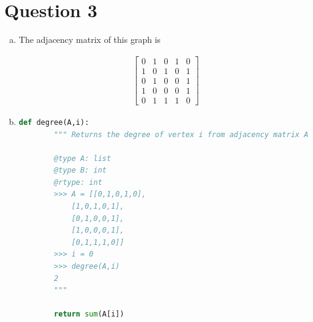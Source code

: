 \documentclass[12pt]{article}
\begin{document}
\section*{Question 3}
\begin{enumerate}[a.]
    \item

    The adjacency matrix of this graph is

    \setcounter{equation}{0}
    \begin{align}
    \begin{bmatrix}
    0 & 1 & 0 & 1 & 0\\
    1 & 0 & 1 & 0 & 1\\
    0 & 1 & 0 & 0 & 1\\
    1 & 0 & 0 & 0 & 1\\
    0 & 1 & 1 & 1 & 0
    \end{bmatrix}
    \end{align}

    \item

    \begin{lstlisting}[language=Python]
    def degree(A,i):
        """ Returns the degree of vertex i from adjacency matrix A

        @type A: list
        @type B: int
        @rtype: int
        >>> A = [[0,1,0,1,0],
            [1,0,1,0,1],
            [0,1,0,0,1],
            [1,0,0,0,1],
            [0,1,1,1,0]]
        >>> i = 0
        >>> degree(A,i)
        2
        """

        return sum(A[i])
    \end{lstlisting}

\end{enumerate}
\end{document}
